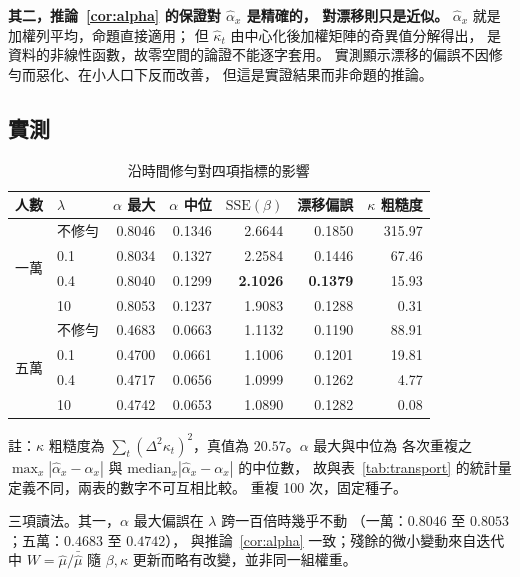 \documentclass[UTF8, fontset=macnew, a4paper, 12pt]{ctexart}
\begin{document}
\textbf{其二，推論~\ref{cor:alpha} 的保證對 $\hat\alpha_x$ 是精確的， 對漂移則只是近似。} $\hat\alpha_x$ 就是加權列平均，命題直接適用；
但 $\hat\kappa_t$ 由中心化後加權矩陣的奇異值分解得出，
是資料的非線性函數，故零空間的論證不能逐字套用。
實測顯示漂移的偏誤不因修勻而惡化、在小人口下反而改善，
但這是實證結果而非命題的推論。

\subsection{實測}\label{subsec:time-emp}

\begin{table}[H]
\centering
\caption{沿時間修勻對四項指標的影響}
\small
\renewcommand{\arraystretch}{1.1}
\begin{tabular}{llrrrrr}
\toprule
人數 & $\lambda$ & $\alpha$ 最大 & $\alpha$ 中位 & $\mathrm{SSE}(\beta)$ & 漂移偏誤 & $\kappa$ 粗糙度\\
\midrule
\multirow{4}{*}{一萬}
 & 不修勻 & 0.8046 & 0.1346 & 2.6644 & 0.1850 & 315.97\\
 & 0.1    & 0.8034 & 0.1327 & 2.2584 & 0.1446 & 67.46\\
 & 0.4    & 0.8040 & 0.1299 & \textbf{2.1026} & \textbf{0.1379} & 15.93\\
 & 10     & 0.8053 & 0.1237 & 1.9083 & 0.1288 & 0.31\\
\midrule
\multirow{4}{*}{五萬}
 & 不修勻 & 0.4683 & 0.0663 & 1.1132 & 0.1190 & 88.91\\
 & 0.1    & 0.4700 & 0.0661 & 1.1006 & 0.1201 & 19.81\\
 & 0.4    & 0.4717 & 0.0656 & 1.0999 & 0.1262 & 4.77\\
 & 10     & 0.4742 & 0.0653 & 1.0890 & 0.1282 & 0.08\\
\bottomrule
\end{tabular}

\vspace{2pt}
\parbox{0.92\textwidth}{\footnotesize 註：$\kappa$ 粗糙度為
$\sum_t(\Delta^2\kappa_t)^2$，真值為 $20.57$。$\alpha$ 最大與中位為
各次重複之 $\max_x|\hat\alpha_x-\alpha_x|$ 與
$\mathrm{median}_x|\hat\alpha_x-\alpha_x|$ 的中位數，
故與表~\ref{tab:transport} 的統計量定義不同，兩表的數字不可互相比較。
重複 100 次，固定種子。}
\label{tab:time}
\end{table}

三項讀法。其一，$\alpha$ 最大偏誤在 $\lambda$ 跨一百倍時幾乎不動
（一萬：$0.8046$ 至 $0.8053$；五萬：$0.4683$ 至 $0.4742$），
與推論~\ref{cor:alpha} 一致；殘餘的微小變動來自迭代中 $W=\hat\mu/\bar{\hat\mu}$
隨 $\beta,\kappa$ 更新而略有改變，並非同一組權重。
\end{document}

